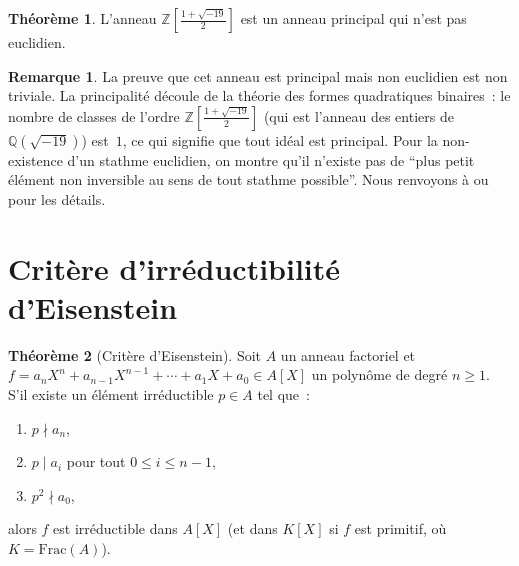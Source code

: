 \documentclass[12pt,a4paper,openany]{book}
\theoremstyle{definition}
\newtheorem{theoreme}{Théorème}[chapter]
\newtheorem{remarque}{Remarque}[chapter]
\newcommand{\Z}{\mathbb{Z}}
\newcommand{\Q}{\mathbb{Q}}
\begin{document}
\begin{theoreme}\label{thm:PID-non-euclidien}
L'anneau $\Z\!\left[\frac{1+\sqrt{-19}}{2}\right]$\index{$\Z[(1+\sqrt{-19})/2]$}
est un anneau principal qui n'est pas euclidien.
\end{theoreme}

\begin{remarque}\label{rem:PID-non-euclidien}
La preuve que cet anneau est principal mais non euclidien est
non triviale. La principalité découle de la théorie des formes
quadratiques binaires~: le nombre de classes de l'ordre
$\Z\!\left[\frac{1+\sqrt{-19}}{2}\right]$ (qui est l'anneau des entiers
de $\Q(\sqrt{-19})$) est~$1$, ce qui signifie que tout idéal est
principal. Pour la non-existence d'un stathme euclidien, on montre
qu'il n'existe pas de ``plus petit élément non inversible au sens de
tout stathme possible''. Nous renvoyons à \cite{DummitFoote} ou
\cite{Jacobson} pour les détails.
\end{remarque}

\section{Critère d'irréductibilité d'Eisenstein}%
\label{sec:eisenstein}

\begin{theoreme}[Critère d'Eisenstein]\label{thm:eisenstein}
Soit $A$ un anneau factoriel et
$f = a_n X^n + a_{n-1} X^{n-1} + \cdots + a_1 X + a_0 \in A[X]$
un polynôme de degré $n \geqslant 1$. S'il existe un élément
irréductible $p \in A$ tel que~:
\begin{enumerate}[label=\textup{(\roman*)}]
  \item $p \nmid a_n$,
  \item $p \mid a_i$ pour tout $0 \leqslant i \leqslant n-1$,
  \item $p^2 \nmid a_0$,
\end{enumerate}
alors $f$ est irréductible dans $A[X]$ (et dans $K[X]$ si $f$ est
primitif, où $K = \mathrm{Frac}(A)$).
\end{theoreme}
\end{document}
